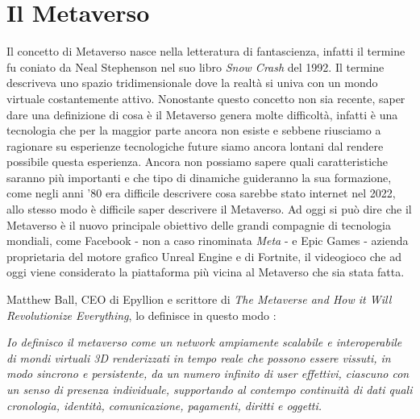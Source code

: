 


\section{Il Metaverso}

    Il concetto di Metaverso nasce nella letteratura di fantascienza, infatti il termine fu coniato da Neal Stephenson nel suo libro \textit{Snow Crash} del 1992. 
    Il termine descriveva uno spazio tridimensionale dove la realtà si univa con un mondo virtuale costantemente attivo.
    Nonostante questo concetto non sia recente, saper dare una definizione di cosa è il Metaverso genera molte difficoltà, infatti è una tecnologia che per la maggior parte ancora non esiste e sebbene riusciamo a ragionare su esperienze tecnologiche future siamo ancora lontani dal rendere possibile questa esperienza.
    Ancora non possiamo sapere quali caratteristiche saranno più importanti e che tipo di dinamiche guideranno la sua formazione, come negli anni '80 era difficile descrivere cosa sarebbe stato internet nel 2022, allo stesso modo è difficile saper descrivere il Metaverso.
    Ad oggi si può dire che il Metaverso è il nuovo principale obiettivo delle grandi compagnie di tecnologia mondiali, come Facebook - non a caso rinominata \textit{Meta} - e Epic Games - azienda proprietaria del motore grafico Unreal Engine e di Fortnite, il videogioco che ad oggi viene considerato la piattaforma più vicina al Metaverso che sia stata fatta.

    Matthew Ball, CEO di Epyllion e scrittore di \textit{The Metaverse and How it Will Revolutionize Everything}, lo definisce in questo modo \cite{Ball2022}: 

    \begin{displayquote}
        \textit{Io definisco il metaverso come un network ampiamente scalabile e interoperabile di mondi virtuali 3D renderizzati in tempo reale che possono essere vissuti, in modo sincrono e persistente, da un numero infinito di user effettivi, ciascuno con un senso di presenza individuale, supportando al contempo continuità di dati quali cronologia, identità, comunicazione, pagamenti, diritti e oggetti.}
    \end{displayquote}

